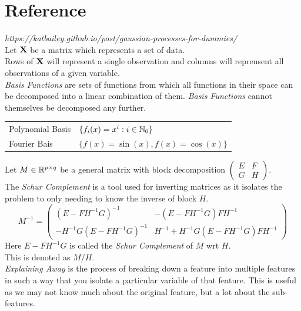 \documentclass[11pt,a4paper]{article}
\begin{document}
\section{Reference}

\textit{https://katbailey.github.io/post/gaussian-processes-for-dummies/}\\

Let $\textbf{X}$ be a matrix which represents a set of data.\\
Rows of $\textbf{X}$ will represent a single observation and columns will reprensent all observations of a given variable.\\

\textit{Basis Functions} are sets of functions from which all functions in their space can be decomposed into a linear combination of them. \textit{Basis Functions} cannot themselves be decomposed any further.
\begin{center}\begin{tabular}{l|l}
Polynomial Basis&$\{f_i(x)=x^i:i\in\mathbb{N}_0\}$\\
Fourier Bais&$\{f(x)=\sin(x),f(x)=\cos(x)\}$
\end{tabular}\end{center}

Let $M\in\mathbb{R}^{p\times q}$ be a general matrix with block decomposition $\begin{pmatrix}E&F\\G&H\end{pmatrix}$.\\
The \textit{Schur Complement} is a tool used for inverting matrices as it isolates the problem to only needing to know the inverse of block $H$.\\
$$M^{-1}=\begin{pmatrix}(E-FH^{-1}G)^{-1}&-(E-FH^{-1}G)FH^{-1}\\-H^{-1}G(E-FH^{-1}G)^{-1}&H^{-1}+H^{-1}G(E-FH^{-1}G)FH^{-1}\end{pmatrix}$$
Here $E-FH^{-1}G$ is called the \textit{Schur Complement} of $M$ wrt $H$.\\
\nb This is denoted as $M/H$.\\

\textit{Explaining Away} is the process of breaking down a feature into multiple features in such a way that you isolate a particular variable of that feature. This is useful as we may not know much about the original feature, but a lot about the sub-features.\\
\end{document}
